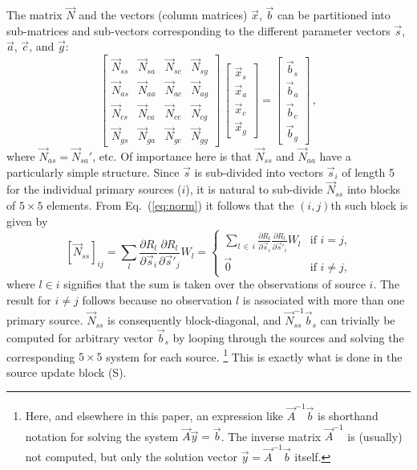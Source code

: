 \documentclass[structabstract]{aa}
\begin{document}
The matrix $\vec{N}$ and the vectors (column matrices) $\vec{x}$, $\vec{b}$
can be partitioned into sub-matrices and sub-vectors corresponding to the
different parameter vectors $\vec{s}$, $\vec{a}$, $\vec{c}$, and $\vec{g}$:
\begin{equation}\label{eq:norm2}
    \begin{bmatrix}
        \vec{N}_{ss}  & \vec{N}_{sa}  & \vec{N}_{sc}  & \vec{N}_{sg}  \\
        \vec{N}_{as}  & \vec{N}_{aa}  & \vec{N}_{ac}  & \vec{N}_{ag}  \\
        \vec{N}_{cs}  & \vec{N}_{ca}  & \vec{N}_{cc}  & \vec{N}_{cg}  \\
        \vec{N}_{gs}  & \vec{N}_{ga}  & \vec{N}_{gc}  & \vec{N}_{gg}
    \end{bmatrix} \,
    \begin{bmatrix}
        \vec{x}_s \\
        \vec{x}_a \\
        \vec{x}_c \\
        \vec{x}_g
    \end{bmatrix} =
    \begin{bmatrix}
        \vec{b}_{s} \\
        \vec{b}_{a} \\
        \vec{b}_{c} \\
        \vec{b}_{g}
    \end{bmatrix} \, ,
\end{equation}
where $\vec{N}_{as}=\vec{N}_{sa}'$, etc. Of importance here is that
$\vec{N}_{ss}$ and $\vec{N}_{aa}$ have a particularly simple structure.
Since $\vec{s}$ is sub-divided into vectors $\vec{s}_i$ of length 5
for the individual primary sources ($i$), it is natural to sub-divide
$\vec{N}_{ss}$ into blocks of $5\times 5$ elements.
From Eq.~(\ref{eq:norm}) it follows that the $(i,j)$th such block is
given by
\begin{equation}\label{eq:Nss}
\left[\vec{N}_{ss}\right]_{ij} = \sum_l
\frac{\partial R_l}{\partial\vec{s}_i}\frac{\partial R_l}{\partial\vec{s}'_{\!j}}
W_l =
\begin{cases}\displaystyle
\sum_{l\,\in\,i} \frac{\partial R_l}{\partial\vec{s}_i}\frac{\partial R_l}{\partial\vec{s}'_{\!i}}
W_l & \text{if $i=j$,}\\[12pt]
\vec{0} & \text{if $i\ne j$,}
\end{cases}
\end{equation}
where $l\in i$ signifies that the sum is taken over the observations of
source $i$. The result for $i\ne j$ follows because no observation $l$ is
associated with more than one primary source. $\vec{N}_{ss}$ is consequently
block-diagonal, and $\vec{N}_{ss}^{-1}\vec{b}_s$ can trivially be computed
for arbitrary vector $\vec{b}_s$ by looping through the sources and
solving the corresponding $5\times 5$ system for each source.%
\footnote{Here, and elsewhere in this paper, an expression like
$\vec{A}^{-1}\vec{b}$ is shorthand notation for solving the system
$\vec{A}\vec{y}=\vec{b}$. The inverse matrix $\vec{A}^{-1}$ is (usually) not computed, but only the
solution vector $\vec{y}=\vec{A}^{-1}\vec{b}$ itself.}
This is exactly what is done in the source update block (S).
\end{document}
